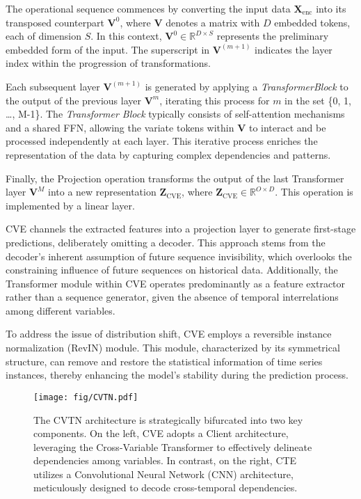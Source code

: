 The operational sequence commences by converting the input data \( \mathbf{X}_{\text{enc}} \) into its transposed counterpart \( \mathbf{V}^0 \), where \( \mathbf{V} \) denotes a matrix with \( D \) embedded tokens, each of dimension \( S \). In this context, \( \mathbf{V}^0 \in \mathbb{R}^{D \times S} \) represents the preliminary embedded form of the input. The superscript in \( \mathbf{V}^{(m+1)} \) indicates the layer index within the progression of transformations.


Each subsequent layer \( \mathbf{V}^{(m+1)} \) is generated by applying a \textit{TransformerBlock} to the output of the previous layer \( \mathbf{V}^{m} \), iterating this process for \( m \) in the set \{0, 1, \ldots, M-1\}. The \textit{Transformer Block} typically consists of self-attention mechanisms and a shared FFN, allowing the variate tokens within \( \mathbf{V} \) to interact and be processed independently at each layer. This iterative process enriches the representation of the data by capturing complex dependencies and patterns.

Finally, the Projection operation transforms the output of the last Transformer layer \( \mathbf{V}^{M} \) into a new representation \( \mathbf{Z}_{\text{CVE}} \), where \( \mathbf{Z}_{\text{CVE}} \in \mathbb{R}^{O \times D} \). This operation is implemented by a linear layer.

CVE channels the extracted features into a projection layer to generate first-stage predictions, deliberately omitting a decoder. This approach stems from the decoder's inherent assumption of future sequence invisibility, which overlooks the constraining influence of future sequences on historical data. Additionally, the Transformer module within CVE operates predominantly as a feature extractor rather than a sequence generator, given the absence of temporal interrelations among different variables.

To address the issue of distribution shift, CVE employs a reversible instance normalization (RevIN)\cite{kim2021reversible} module. This module, characterized by its symmetrical structure, can remove and restore the statistical information of time series instances, thereby enhancing the model's stability during the prediction process.

\begin{figure}[!htbp]
  \vspace{-10pt}
    \texttt{[image: fig/CVTN.pdf]}
    \centering
    \caption{{The CVTN architecture is strategically bifurcated into two key components. On the left, CVE adopts a Client\cite{gao2023client} architecture, leveraging the Cross-Variable Transformer to effectively delineate dependencies among variables. In contrast, on the right, CTE utilizes a Convolutional Neural Network (CNN) architecture, meticulously designed to decode cross-temporal dependencies.}} 
    \label{fig:cvtn}
  \end{figure}
 
